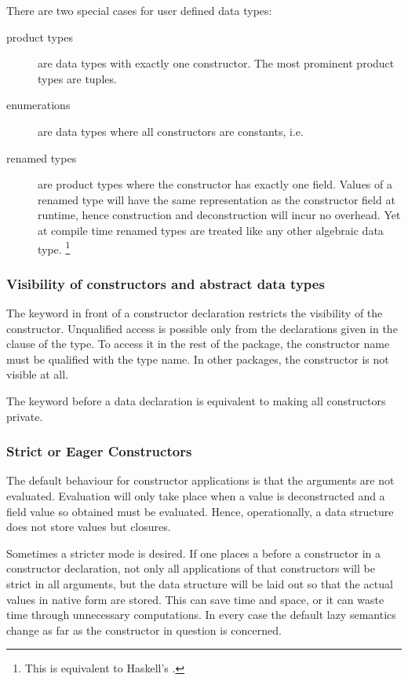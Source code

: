 There are two special cases for user defined data types:
\begin{description}
\item [product types] are data types with exactly one constructor. The most prominent product types are tuples.
\item [enumerations] are data types where all constructors are constants, i.e. 
\item [renamed types] are product types where the constructor has exactly one field. Values of a renamed type will have the same representation as the constructor field at runtime, hence construction and deconstruction will incur no overhead. Yet at compile time renamed types are treated like any other algebraic data type.
\footnote{This is equivalent to Haskell's .}
\end{description}

\subsubsection{Visibility of constructors and abstract data types}

The keyword  in front of a constructor declaration restricts the visibility of the constructor. Unqualified access is possible only from the declarations given in the  clause of the type. To access it in the rest of the package, the constructor name must be qualified with the type name. In other packages, the constructor is not visible at all.

The keyword  before a data declaration is equivalent to making all constructors private.

\subsubsection{Strict or Eager Constructors}

The default behaviour for constructor applications is that the arguments are not evaluated. Evaluation will only take place when a value is deconstructed and a field value so obtained must be evaluated. Hence, operationally, a data structure does not store values but closures.

Sometimes a stricter mode is desired. If one places a \sym{!} before a constructor in a constructor declaration, not only all applications of that constructors will be strict in all arguments, but the data structure will be laid out so that the actual values in native form are stored. This can save time and space, or it can waste time through unnecessary computations. In every case the default lazy semantics change as far as the constructor in question is concerned. 

